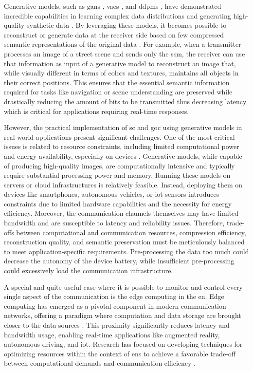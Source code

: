 Generative models, such as \glspl{gan} \cite{goodfellow2014generative}, \glspl{vae} \cite{Kingma2014VAE}, and \glspl{ddpm} \cite{Ho2020ddpm}, have demonstrated incredible capabilities in learning complex data distributions and generating high-quality synthetic data \cite{Dhariwal2021DDPM_beat_GAN}. By leveraging these models, it becomes possible to reconstruct or generate data at the receiver side based on few compressed semantic representations of the original data \cite{He2022Robust}. For example, when a transmitter processes an image of a street scene and sends only the \gls{ssm}, the receiver can use that information as input of a generative model to reconstruct an image that, while visually different in terms of colors and textures, maintains all objects in their correct positions. This ensures that the essential semantic information required for tasks like navigation or scene understanding are preserved while drastically reducing the amount of bits to be transmitted thus decreasing latency which is critical for applications requiring real-time responses.

However, the practical implementation of \gls{sc} and \gls{goc} using generative models in real-world applications present significant challenges. One of the most critical issues is related to resource constraints, including limited computational power and energy availability, especially on devices \cite{Zhou2019Edge, Chis2016PerformanceEnergy, Wang2019An}. Generative models, while capable of producing high-quality images, are computationally intensive and typically require substantial processing power and memory. Running these models on servers or cloud infrastructures is relatively feasible. Instead, deploying them on devices like smartphones, autonomous vehicles, or \gls{iot} sensors introduces constraints due to limited hardware capabilities and the necessity for energy efficiency. Moreover, the communication channels themselves may have limited bandwidth and are susceptible to latency and reliability issues. Therefore, trade-offs between computational and communication resources, compression efficiency, reconstruction quality, and semantic preservation must be meticulously balanced to meet application-specific requirements. Pre-processing the data too much could decrease the autonomy of the device battery, while insufficient pre-processing could excessively load the communication infrastructure.

A special and quite useful case where it is possible to monitor and control every single aspect of the communication is the edge computing in the \gls{en}. Edge computing has emerged as a pivotal component in modern communication networks, offering a paradigm where computation and data storage are brought closer to the data sources \cite{Shi2016edge}. This proximity significantly reduces latency and bandwidth usage, enabling real-time applications like augmented reality, autonomous driving, and \gls{iot}. 
Research has focused on developing techniques for optimizing resources within the context of \glspl{en} to achieve a favorable trade-off between computational demands and communication efficiency \cite{Binucci2023goaloriented, Hu2024Semantic}.

